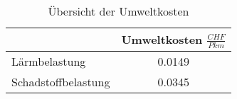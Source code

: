 %
%
%
%

\begin{table}[h!]
\flushleft
\renewcommand{\arraystretch}{1.4}

\begin{tabular}{ @{} l|c @{} }
            			& Umweltkosten   $\frac{CHF}{Pkm}$	       \\ \hline
Lärmbelastung           &      	0.0149 								\\
Schadstoffbelastung	    &       0.0345          		                     		                       
\end{tabular}
\caption{Übersicht der Umweltkosten}
\label{tab:t-04-03-01-Umwelt}
\end{table}

%
%





%


